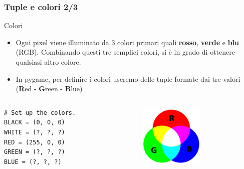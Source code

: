 \documentclass{beamer}
\begin{document}
\begin{frame}[fragile]
\frametitle{Tuple e colori 2/3}
\begin{block}{Colori}
	\begin{itemize}
		\item Ogni pixel viene illuminato da 3 colori primari quali \textbf{rosso}, \textbf{verde} e \textbf{blu} (RGB). Combinando questi tre semplici colori, si è in grado di ottenere qualsiasi altro colore.
		\item In pygame, per definire i colori useremo delle tuple formate dai tre valori (\textbf{R}ed - \textbf{G}reen - \textbf{B}lue)
	\end{itemize}
\end{block}
\begin{columns}[T]
	\begin{column}[T]{0.55\textwidth}
		\begin{lstlisting}
# Set up the colors.
BLACK = (0, 0, 0)
WHITE = (?, ?, ?)
RED = (255, 0, 0)
GREEN = (?, ?, ?)
BLUE = (?, ?, ?)
		\end{lstlisting}
	\end{column}
	\begin{column}[T]{0.45\textwidth}
		\begin{figure}[t]
			\includegraphics[height=3cm, width=3cm]{images/RGB.png}
		\end{figure}
	\end{column}
\end{columns}
\end{frame}
\end{document}
